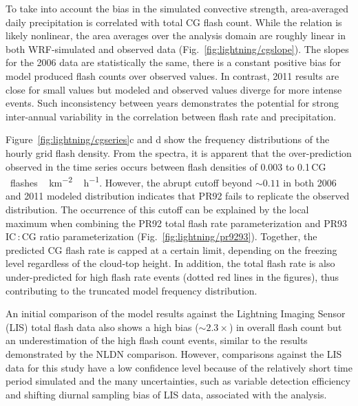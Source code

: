 To take into account the bias in the simulated convective strength,
area-averaged daily precipitation is correlated with total CG flash count.
While the relation is likely nonlinear, the area averages over the analysis
domain are roughly linear in both WRF-simulated and observed data
(Fig.~\ref{fig:lightning/cgslope}). The slopes for the 2006 data are statistically the
same, there is a constant positive bias for model produced flash counts over
observed values. In contrast, 2011 results are close for small values but
modeled and observed values diverge for more intense events. Such
inconsistency between years demonstrates the potential for strong
inter-annual variability in the correlation between flash rate and
precipitation.

Figure~\ref{fig:lightning/cgseries}c and d show the frequency
distributions of the hourly grid flash density. From the spectra, it is
apparent that the over-prediction observed in the time series occurs between
flash densities of 0.003 to 0.1\,\unit{CG\,flashes\,km^{-2}\,h^{-1}}.
However, the abrupt cutoff beyond $\sim0.11$ in both 2006 and 2011 modeled
distribution indicates that PR92 fails to replicate the observed
distribution. The occurrence of this cutoff can be explained by the local
maximum when combining the PR92 total flash rate parameterization and PR93
IC\,:\,CG ratio parameterization (Fig.~\ref{fig:lightning/pr9293}). Together, the
predicted CG flash rate is capped at a certain limit, depending on the
freezing level regardless of the cloud-top height. In addition, the total
flash rate is also under-predicted for high flash rate events (dotted red
lines in the figures), thus contributing to the truncated model frequency
distribution.


An initial comparison of the model results against the Lightning Imaging
Sensor (LIS) total flash data also shows a high bias ($\sim2.3\times$) in
overall flash count but an underestimation of the high flash count events,
similar to the results demonstrated by the NLDN comparison. However,
comparisons against the LIS data for this study have a low confidence level
because of the relatively short time period simulated and the many
uncertainties, such as variable detection efficiency and shifting diurnal
sampling bias of LIS data, associated with the analysis.

